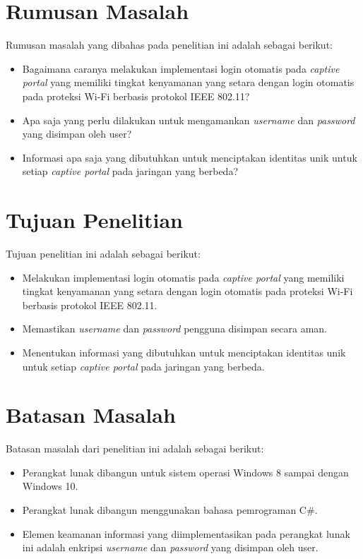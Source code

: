 \section{Rumusan Masalah}
\label{sec:rumusan_masalah}

Rumusan masalah yang dibahas pada penelitian ini adalah sebagai berikut:

\begin{itemize}
	\item{Bagaimana caranya melakukan implementasi login otomatis pada \textit{captive portal} yang memiliki tingkat kenyamanan yang setara dengan login otomatis pada proteksi Wi-Fi berbasis protokol IEEE 802.11?}
	\item{Apa saja yang perlu dilakukan untuk mengamankan \textit{username} dan \textit{password} yang disimpan oleh user?}
	\item{Informasi apa saja yang dibutuhkan untuk menciptakan identitas unik untuk setiap \textit{captive portal} pada jaringan yang berbeda?}
\end{itemize}



\section{Tujuan Penelitian}
\label{sec:tujuan_penelitian}

Tujuan penelitian ini adalah sebagai berikut:

\begin{itemize}
	\item{Melakukan implementasi login otomatis pada \textit{captive portal} yang memiliki tingkat kenyamanan yang setara dengan login otomatis pada proteksi Wi-Fi berbasis protokol IEEE 802.11.}
	\item{Memastikan \textit{username} dan \textit{password} pengguna disimpan secara aman.}
	\item{Menentukan informasi yang dibutuhkan untuk menciptakan identitas unik untuk setiap \textit{captive portal} pada jaringan yang berbeda.}
\end{itemize}



\section{Batasan Masalah}
\label{sec:batasan_masalah}

Batasan masalah dari penelitian ini adalah sebagai berikut:

\begin{itemize}
	\item{Perangkat lunak dibangun untuk sistem operasi Windows 8 sampai dengan Windows 10.}
    \item{Perangkat lunak dibangun menggunakan bahasa pemrograman C\#.}
	\item{Elemen keamanan informasi yang diimplementasikan pada perangkat lunak ini adalah enkripsi \textit{username} dan \textit{password} yang disimpan oleh user.}
\end{itemize}



